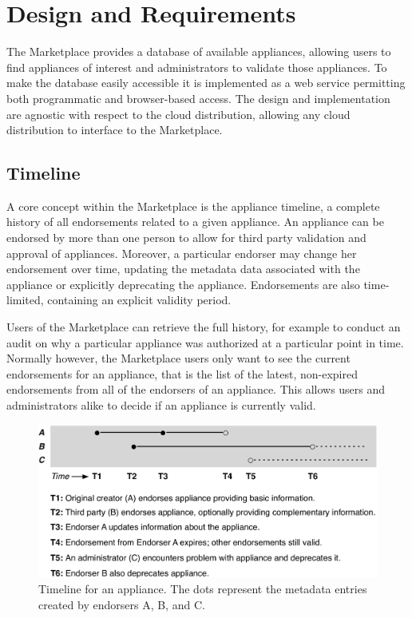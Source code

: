 \section{Design and Requirements}
\label{sec:design}

The Marketplace provides a database of available appliances, allowing
users to find appliances of interest and administrators to validate
those appliances.  To make the database easily accessible it is
implemented as a web service permitting both programmatic and
browser-based access.  The design and implementation are agnostic with
respect to the cloud distribution, allowing any cloud distribution to
interface to the Marketplace\@.

\subsection{Timeline}

A core concept within the Marketplace is the appliance timeline, a
complete history of all endorsements related to a given appliance.  An
appliance can be endorsed by more than one person to allow for third
party validation and approval of appliances.  Moreover, a particular
endorser may change her endorsement over time, updating the metadata
data associated with the appliance or explicitly deprecating the
appliance.  Endorsements are also time-limited, containing an explicit
validity period.

Users of the Marketplace can retrieve the full history, for example to
conduct an audit on why a particular appliance was authorized at a
particular point in time.  Normally however, the Marketplace users
only want to see the current endorsements for an appliance, that is
the list of the latest, non-expired endorsements from all of the
endorsers of an appliance.  This allows users and administrators alike
to decide if an appliance is currently valid.

\begin{figure}
\begin{center}
\includegraphics[width=\columnwidth]{timeline.pdf}
\end{center}
\caption{Timeline for an appliance.  The dots represent the metadata
  entries created by endorsers A, B, and C\@.}
\label{fig-timeline}
\end{figure}

